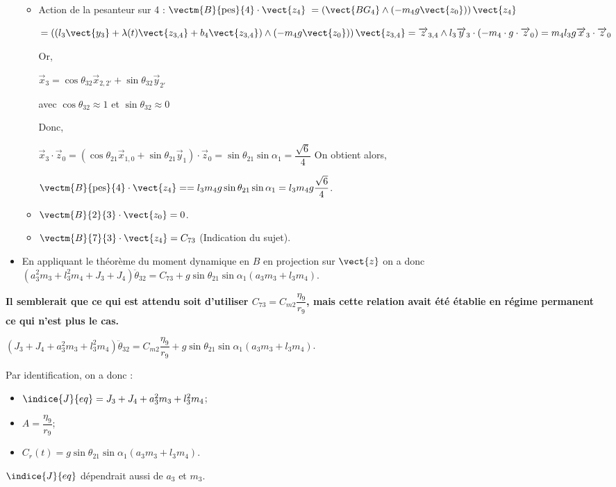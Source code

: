 \begin{corrige}
\begin{itemize}
\begin{itemize}
\item Action de la pesanteur sur 4 : 
$\vectm{B}{\text{pes}}{4}\cdot \vect{z_4} $ $ =\left(\vect{BG_4}\wedge \left(-m_4g \vect{z_0}\right) \right)\vect{z_4}$ 

$ =\left(\left(l_3\vect{y_3} + \lambda(t) \vect{z_{3,4}} + b_4\vect{z_{3,4}} \right)\wedge \left(-m_4g \vect{z_0}\right) \right)\vect{z_{3,4}}
=\overrightarrow{z}_{3,4}\wedge l_3\overrightarrow{y}_3\cdot \left(-m_4\cdot g\cdot \overrightarrow{z}_0\right)=m_4l_3g\overrightarrow{x}_3\cdot \overrightarrow{z}_0
$

Or,

$\overrightarrow{x}_3=\cos\theta_{32}\overrightarrow{x}_{2,2'}+\sin\theta_{32}\overrightarrow{y}_{2'}$

avec $\cos\theta_{32}\approx 1$ et $\sin\theta_{32}\approx 0$

 Donc, 
 
 $\overrightarrow{x}_3\cdot \overrightarrow{z}_0=\left(\cos\theta_{21}\overrightarrow{x}_{1,0}+\sin\theta_{21}\overrightarrow{y}_1\right)\cdot \overrightarrow{z}_0=\sin\theta_{21}\sin\alpha_1=\dfrac{\sqrt{6}}{4}$
 On obtient alors,
 
 $\vectm{B}{\text{pes}}{4}\cdot \vect{z_4} = =l_3 m_4g\sin\theta_{21}\sin\alpha_1 =l_3 m_4g  \dfrac{\sqrt{6}}{4}$.

\item $\vectm{B}{2}{3}\cdot \vect{z_0}=0$.
\item $\vectm{B}{7}{3}\cdot \vect{z_4}=C_{73}$ (Indication du sujet).
\end{itemize}
\item En appliquant le théorème du moment dynamique en $B$ en projection sur $\vect{z}$ on a donc 
$  \left( a_3^2 m_3  +l_3^2 m_4+J_3+J_4\right) \ddot{\theta}_{32}=C_{73} + g  \sin \theta_{21}   \sin \alpha_1 \left( a_3 m_3 + l_3 m_4\right) $.
\end{itemize}

\textbf{Il semblerait que ce qui est attendu soit d'utiliser ${C_{73}}=C_{m2}\dfrac{\eta_9}{r_9}$, mais cette relation avait été établie en régime permanent ce qui n'est plus le cas. } 


$\left(J_3+J_4  + a_3^2 m_3  +l_3^2 m_4 \right) \ddot{\theta}_{32} =C_{m2}\dfrac{\eta_9}{r_9}+ g  \sin \theta_{21}   \sin \alpha_1 \left( a_3 m_3 + l_3 m_4\right) $.

Par identification, on a donc :
\begin{itemize}
\item $\indice{J}{eq} = J_3+J_4  + a_3^2 m_3  +l_3^2 m_4$;
\item $A  =\dfrac{\eta_9}{r_9}$;
\item $C_r(t)=g  \sin \theta_{21}   \sin \alpha_1 \left( a_3 m_3 + l_3 m_4\right) $.
\end{itemize}

\begin{rem} 
$\indice{J}{eq}$ dépendrait aussi de $a_3$ et $m_3$.
\end{rem}
\end{corrige}
\else
\fi


